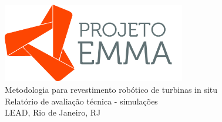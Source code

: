 \vfill%
\begin{center}
  {\GRANDE \raisebox{1.4ex}{} \includegraphics[width=80mm]{logo/projeto-EMMA-logo.jpg}} \\[10mm]
  {\Grande Metodologia para revestimento robótico de turbinas in situ} \\[25mm]
  {\Grande Relatório de avaliação técnica - simulações} \\[20mm]
  {\large LEAD, Rio de Janeiro, RJ} \\[5mm]
  \vfill%
\end{center}

\newpage%
\pagestyle{fancy}%
\thispagestyle{fancy}%
\renewcommand{\headrulewidth}  {0.4pt}%
\renewcommand{\footrulewidth}  {0.4pt}%
%
%
\rhead{\sf\thepage}%
%
\cfoot{}%
\rfoot{\sf [\hours] \quad \today}%
